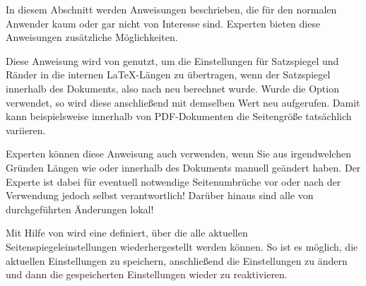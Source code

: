 In diesem Abschnitt werden Anweisungen beschrieben, die für den normalen
Anwender kaum oder gar nicht von Interesse sind. Experten bieten diese
Anweisungen zusätzliche Möglichkeiten.

\begin{Declaration}
\end{Declaration}%
Diese Anweisung wird von  genutzt, um die Einstellungen für
Satzspiegel und Ränder in die internen \LaTeX-Längen zu übertragen, wenn der
Satzspiegel innerhalb des Dokuments, also nach
 neu berechnet wurde. Wurde die Option
 verwendet, so wird diese anschließend mit
demselben Wert neu aufgerufen. Damit kann beispielsweise innerhalb von
PDF-Dokumenten die Seitengröße tatsächlich variieren.

Experten können diese Anweisung auch verwenden, wenn Sie aus irgendwelchen
Gründen Längen wie  oder  innerhalb des
Dokuments manuell geändert haben. Der Experte ist dabei für eventuell
notwendige Seitenumbrüche vor oder nach der Verwendung jedoch selbst
verantwortlich! Darüber hinaus sind alle von 
durchgeführten Änderungen lokal!%
\EndIndexGroup


\begin{Declaration}
\end{Declaration}
Mit Hilfe von  wird eine  definiert, über
die alle aktuellen Seitenspiegeleinstellungen wiederhergestellt werden
können. So ist es möglich, die aktuellen Einstellungen zu speichern,
anschließend die Einstellungen zu ändern und dann die gespeicherten
Einstellungen wieder zu reaktivieren.

